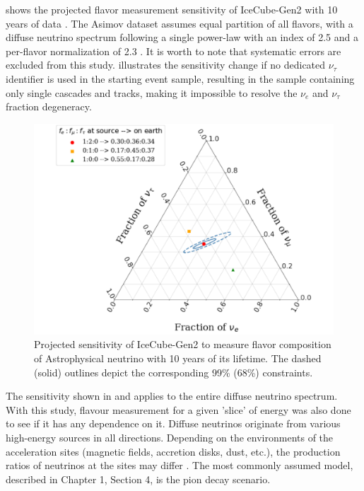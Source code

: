  shows the projected flavor measurement sensitivity of IceCube-Gen2 with 10 years of data . The Asimov dataset assumes equal partition of all flavors, with a diffuse neutrino spectrum following a single power-law with an index of 2.5 and a per-flavor normalization of 2.3 . It is worth to note that systematic errors are excluded from this study.  illustrates the sensitivity change if no dedicated $\nu_{\tau}$ identifier is used in the starting event sample, resulting in the sample containing only single cascades and tracks, making it impossible to resolve the $\nu_e$ and $\nu_{\tau}$ fraction degeneracy.

\begin{figure}[h!]
    \centering
    \includegraphics{./figures/gen2/Gen2-10Years.pdf}
    \caption{Projected sensitivity of IceCube-Gen2 to measure flavor composition of Astrophysical neutrino with 10 years of its lifetime. The dashed (solid) outlines depict the corresponding 99\% (68\%) constraints.}
\end{figure}

The sensitivity shown in  and  applies to the entire diffuse neutrino spectrum. With this study, flavour measurement for a given 'slice' of energy was also done to see if it has any dependence on it. Diffuse neutrinos originate from various high-energy sources in all directions. Depending on the environments of the acceleration sites (magnetic fields, accretion disks, dust, etc.), the production ratios of neutrinos at the sites may differ . The most commonly assumed model, described in Chapter 1, Section 4, is the pion decay scenario.

